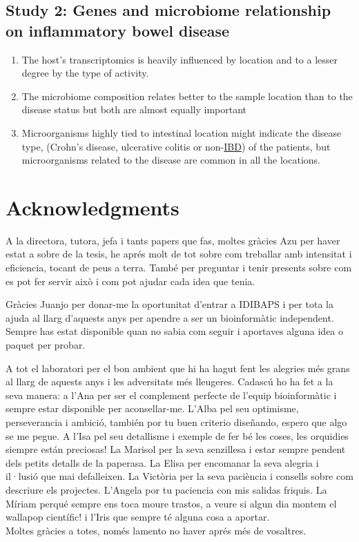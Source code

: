 \documentclass[
  12pt,
  a4paper,
  twoside,
  openright]{book}
\providecommand{\tightlist}{%
  \setlength{\itemsep}{0pt}\setlength{\parskip}{0pt}}
\begin{document}
\hypertarget{study-2-genes-and-microbiome-relationship-on-inflammatory-bowel-disease}{%
\section{Study 2: Genes and microbiome relationship on inflammatory bowel disease}\label{study-2-genes-and-microbiome-relationship-on-inflammatory-bowel-disease}}

\begin{enumerate}
\def\labelenumi{\arabic{enumi}.}
\tightlist
\item
  The host's transcriptomics is heavily influenced by location and to a lesser degree by the type of activity.
\item
  The microbiome composition relates better to the sample location than to the disease status but both are almost equally important
\item
  Microorganisms highly tied to intestinal location might indicate the disease type, (Crohn's disease, ulcerative colitis or non-\protect\hyperlink{acronyms_IBD}{IBD}) of the patients, but microorganisms related to the disease are common in all the locations.
\end{enumerate}

\hypertarget{acknowledgments}{%
\chapter{Acknowledgments}\label{acknowledgments}}

A la directora, tutora, jefa i tants papers que fas, moltes gràcies Azu per haver estat a sobre de la tesis, he aprés molt de tot sobre com treballar amb intensitat i eficiencia, tocant de peus a terra.
També per preguntar i tenir presents sobre com es pot fer servir això i com pot ajudar cada idea que tenia.

Gràcies Juanjo per donar-me la oportunitat d'entrar a IDIBAPS i per tota la ajuda al llarg d'aquests anys per apendre a ser un bioinformàtic independent.
Sempre has estat disponible quan no sabia com seguir i aportaves alguna idea o paquet per probar.

A tot el laboratori per el bon ambient que hi ha hagut fent les alegries més grans al llarg de aquests anys i les adversitats més lleugeres.
Cadascú ho ha fet a la seva manera: a l'Ana per ser el complement perfecte de l'equip bioinformàtic i sempre estar disponible per aconsellar-me.
L'Alba pel seu optimisme, perseverancia i ambició, también por tu buen criterio diseñando, espero que algo se me pegue.
A l'Isa pel seu detallisme i exemple de fer bé les coses, les orquidies siempre están preciosas!
La Marisol per la seva senzillesa i estar sempre pendent dels petits detalls de la paperasa.
La Elisa per encomanar la seva alegria i il·lusió que mai defalleixen.
La Victòria per la seva paciència i consells sobre com descriure els projectes.
L'Angela por tu paciencia con mis salidas friquis.
La Míriam perqué sempre ens toca moure trastos, a veure si algun dia montem el wallapop científic! i l'Iris que sempre té alguna cosa a aportar.\\
Moltes gràcies a totes, només lamento no haver aprés més de vosaltres.
\end{document}
